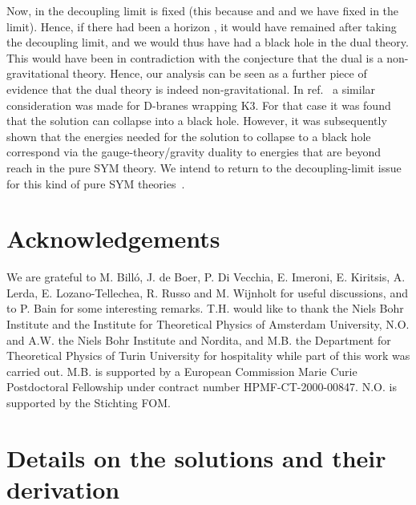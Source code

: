 \documentclass[a4paper,11pt]{article}
\providecommand{\gym}{g_{\mathrm{YM}}}
\begin{document}
Now, in the decoupling limit \coordHE{} is fixed (this because \coordHE{} and \myHighlight{$r_e\sim\alpha' \gym^2 M$}\coordHE{} and we have \myHighlight{$\gym^2 M$}\coordHE{} fixed in
the limit). Hence, if there had been a horizon \coordHE{}, it would
have remained after taking the decoupling limit, and we would thus
have had a black hole in the dual theory. This would have been in
contradiction with the conjecture that the dual is a non-gravitational
theory. Hence, our analysis can be seen as a further piece of evidence
that the dual theory is indeed non-gravitational. In
ref.~\cite{Johnson:1999qt} a similar  consideration was made for
D-branes wrapping K3. For that case it was found that the solution
can collapse into a black hole. However, it was subsequently shown
that the energies needed for the solution to collapse to a black hole
correspond via the gauge-theory/gravity duality to energies that are
beyond reach in the pure SYM theory. We intend to return to the
decoupling-limit issue for this kind of pure SYM
theories~\cite{Bertolini:2002ab}.


\vspace{1ex}
\section*{Acknowledgements}

We are grateful to M. Bill\'o, J. de Boer, P. Di Vecchia, E. Imeroni,
E. Kiritsis, A. Lerda, E. Lozano-Tellechea, R. Russo and M. Wijnholt
for useful discussions, and to P. Bain for some interesting remarks.
T.H. would like to thank the Niels Bohr Institute and the Institute
for Theoretical Physics of Amsterdam University, N.O. and A.W. the
Niels Bohr Institute and Nordita, and M.B. the Department for Theoretical
Physics of Turin University for hospitality while part of this work was
carried out. M.B. is supported by a European Commission Marie Curie
Postdoctoral Fellowship under contract number HPMF-CT-2000-00847.
N.O. is supported by the Stichting FOM.

\vspace{1ex} \appendix

\section{Details on the solutions and their derivation}
\label{sec:theapp}
\end{document}
